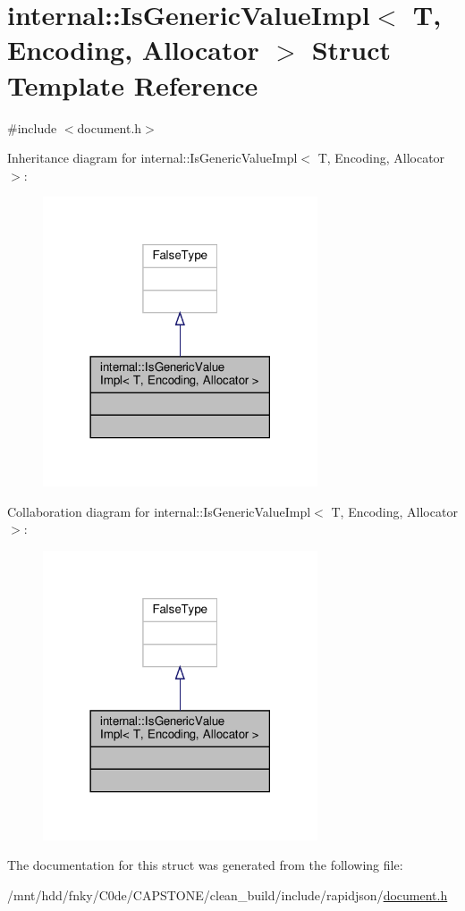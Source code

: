\hypertarget{structinternal_1_1IsGenericValueImpl}{}\section{internal\+:\+:Is\+Generic\+Value\+Impl$<$ T, Encoding, Allocator $>$ Struct Template Reference}
\label{structinternal_1_1IsGenericValueImpl}


{\ttfamily \#include $<$document.\+h$>$}



Inheritance diagram for internal\+:\+:Is\+Generic\+Value\+Impl$<$ T, Encoding, Allocator $>$\+:
\nopagebreak
\begin{figure}[H]
\begin{center}
\leavevmode
\includegraphics[width=230pt]{structinternal_1_1IsGenericValueImpl__inherit__graph}
\end{center}
\end{figure}


Collaboration diagram for internal\+:\+:Is\+Generic\+Value\+Impl$<$ T, Encoding, Allocator $>$\+:
\nopagebreak
\begin{figure}[H]
\begin{center}
\leavevmode
\includegraphics[width=230pt]{structinternal_1_1IsGenericValueImpl__coll__graph}
\end{center}
\end{figure}


The documentation for this struct was generated from the following file\+:\begin{DoxyCompactItemize}
\item 
/mnt/hdd/fnky/\+C0de/\+C\+A\+P\+S\+T\+O\+N\+E/clean\+\_\+build/include/rapidjson/\hyperlink{document_8h}{document.\+h}\end{DoxyCompactItemize}
